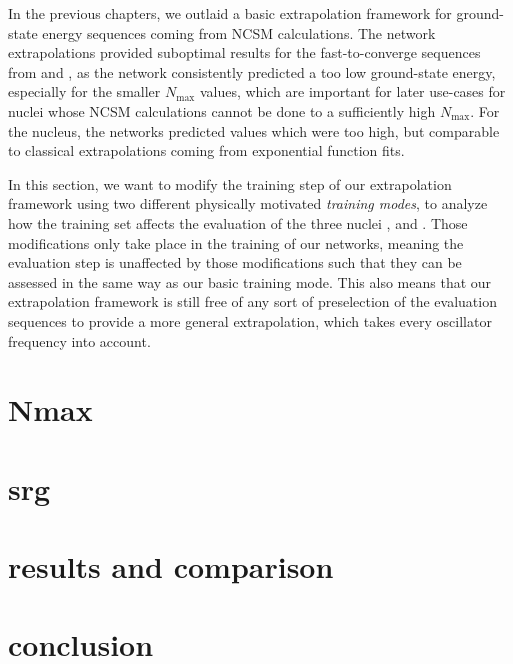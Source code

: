 In the previous chapters, we outlaid a basic extrapolation framework for ground-state energy sequences coming from NCSM calculations. The network extrapolations provided suboptimal results for the fast-to-converge sequences from  and , as the network consistently predicted a too low ground-state energy, especially for the smaller $N_\mathrm{max}$ values, which are important for later use-cases for nuclei whose NCSM calculations cannot be done to a sufficiently high $N_\mathrm{max}$. For the  nucleus, the networks predicted values which were too high, but comparable to classical extrapolations coming from exponential function fits.

In this section, we want to modify the training step of our extrapolation framework using two different physically motivated \textit{training modes}, to analyze how the training set affects the evaluation of the three nuclei ,  and . Those modifications only take place in the training of our networks, meaning the evaluation step is unaffected by those modifications such that they can be assessed in the same way as our basic training mode. This also means that our extrapolation framework is still free of any sort of preselection of the evaluation sequences to provide a more general extrapolation, which takes every oscillator frequency into account.
\section{Nmax}

\section{srg}

\section{results and comparison}

\section{conclusion}

